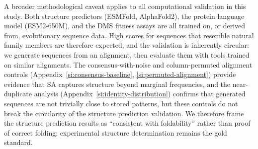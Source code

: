 A broader methodological caveat applies to all computational validation in this study. Both structure predictors (ESMFold, AlphaFold2), the protein language model (ESM2-650M), and the DMS fitness assays are all trained on, or derived from, evolutionary sequence data. High scores for sequences that resemble natural family members are therefore expected, and the validation is inherently circular: we generate sequences from an alignment, then evaluate them with tools trained on similar alignments. The consensus-with-noise and column-permuted alignment controls (Appendix~\ref{si:consensus-baseline}, \ref{si:permuted-alignment}) provide evidence that SA captures structure beyond marginal frequencies, and the near-duplicate analysis (Appendix~\ref{si:identity-distribution}) confirms that generated sequences are not trivially close to stored patterns, but these controls do not break the circularity of the structure prediction validation. We therefore frame the structure prediction results as ``consistent with foldability'' rather than proof of correct folding; experimental structure determination remains the gold standard.

